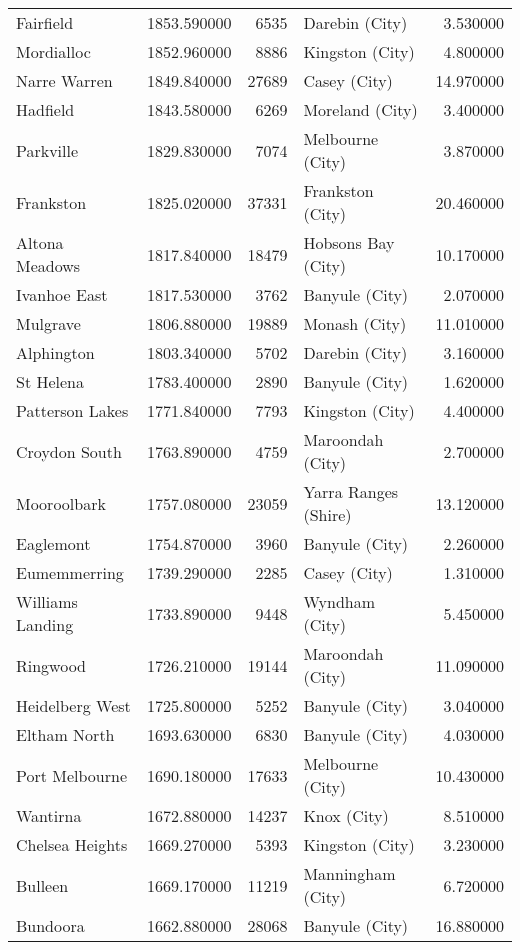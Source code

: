 \begin{table}
\begin{tabular}{lrrlr}
Fairfield & 1853.590000 & 6535 & Darebin (City) & 3.530000 \\
Mordialloc & 1852.960000 & 8886 & Kingston (City) & 4.800000 \\
Narre Warren & 1849.840000 & 27689 & Casey (City) & 14.970000 \\
Hadfield & 1843.580000 & 6269 & Moreland (City) & 3.400000 \\
Parkville & 1829.830000 & 7074 & Melbourne (City) & 3.870000 \\
Frankston & 1825.020000 & 37331 & Frankston (City) & 20.460000 \\
Altona Meadows & 1817.840000 & 18479 & Hobsons Bay (City) & 10.170000 \\
Ivanhoe East & 1817.530000 & 3762 & Banyule (City) & 2.070000 \\
Mulgrave & 1806.880000 & 19889 & Monash (City) & 11.010000 \\
Alphington & 1803.340000 & 5702 & Darebin (City) & 3.160000 \\
St Helena & 1783.400000 & 2890 & Banyule (City) & 1.620000 \\
Patterson Lakes & 1771.840000 & 7793 & Kingston (City) & 4.400000 \\
Croydon South & 1763.890000 & 4759 & Maroondah (City) & 2.700000 \\
Mooroolbark & 1757.080000 & 23059 & Yarra Ranges (Shire) & 13.120000 \\
Eaglemont & 1754.870000 & 3960 & Banyule (City) & 2.260000 \\
Eumemmerring & 1739.290000 & 2285 & Casey (City) & 1.310000 \\
Williams Landing & 1733.890000 & 9448 & Wyndham (City) & 5.450000 \\
Ringwood & 1726.210000 & 19144 & Maroondah (City) & 11.090000 \\
Heidelberg West & 1725.800000 & 5252 & Banyule (City) & 3.040000 \\
Eltham North & 1693.630000 & 6830 & Banyule (City) & 4.030000 \\
Port Melbourne & 1690.180000 & 17633 & Melbourne (City) & 10.430000 \\
Wantirna & 1672.880000 & 14237 & Knox (City) & 8.510000 \\
Chelsea Heights & 1669.270000 & 5393 & Kingston (City) & 3.230000 \\
Bulleen & 1669.170000 & 11219 & Manningham (City) & 6.720000 \\
Bundoora & 1662.880000 & 28068 & Banyule (City) & 16.880000 \\

\end{tabular}
\end{table}
